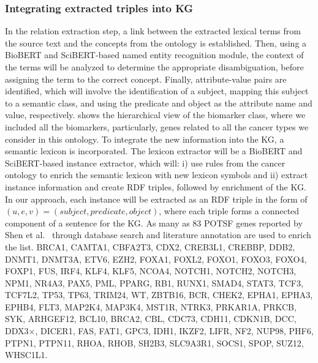 \subsubsection{Integrating extracted triples into KG}
In the relation extraction step, a link between the extracted lexical terms from the source text and the concepts from the ontology is established. Then, using a BioBERT and SciBERT-based named entity recognition module, the context of the terms will be analyzed to determine the appropriate disambiguation, before assigning the term to the correct concept. Finally, attribute-value pairs are identified, which will involve the identification of a subject, mapping this subject to a semantic class, and using the predicate and object as the attribute name and value, respectively.  shows the hierarchical view of the biomarker class, where we included all the biomarkers, particularly, genes related to all the cancer types we consider in this ontology. 
\hspace*{3.5mm} To integrate the new information into the KG, a semantic lexicon is incorporated. The lexicon extractor will be a BioBERT and SciBERT-based instance extractor, which will: i) use rules from the cancer ontology to enrich the semantic lexicon with new lexicon symbols and ii) extract instance information and create RDF triples, followed by enrichment of the KG. In our approach, each instance will be extracted as an RDF triple in the form of $(u,e,v)=(\mathit{subject},\mathit{predicate},\mathit{object})$, where each triple forms a connected component of a sentence for the KG. As many as 83 POTSF genes reported by Shen et al.~\cite{POSTF} through database search and literature annotation are used to enrich the list. 
BRCA1, CAMTA1, CBFA2T3, CDX2, CREB3L1, CREBBP, DDB2, DNMT1, DNMT3A, ETV6, EZH2, FOXA1, FOXL2, FOXO1, FOXO3, FOXO4, FOXP1, FUS, IRF4, KLF4, KLF5, NCOA4, NOTCH1, NOTCH2, NOTCH3, NPM1, NR4A3, PAX5, PML, PPARG, RB1, RUNX1, SMAD4, STAT3, TCF3, TCF7L2, TP53, TP63, TRIM24, WT, ZBTB16, BCR, CHEK2, EPHA1, EPHA3, EPHB4, FLT3, MAP2K4, MAP3K4, MST1R, NTRK3, PRKAR1A, PRKCB, SYK, ARHGEF12, BCL10, BRCA2, CBL, CDC73, CDH11, CDKN1B, DCC, DDX3×, DICER1, FAS, FAT1, GPC3, IDH1, IKZF2, LIFR, NF2, NUP98, PHF6, PTPN1, PTPN11, RHOA, RHOB, SH2B3, SLC9A3R1, SOCS1, SPOP, SUZ12, WHSC1L1. 

